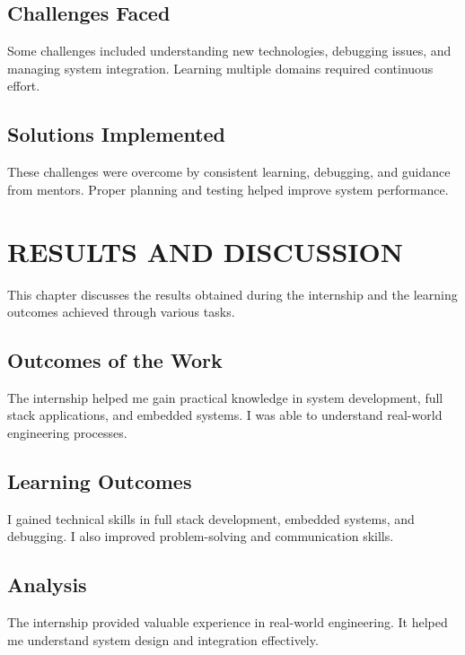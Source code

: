 \documentclass[12pt,a4paper]{report}
\begin{document}
\section{Challenges Faced}

Some challenges included understanding new technologies, debugging issues, and managing system integration. Learning multiple domains required continuous effort.


\section{Solutions Implemented}

These challenges were overcome by consistent learning, debugging, and guidance from mentors. Proper planning and testing helped improve system performance.


\chapter{RESULTS AND DISCUSSION}


This chapter discusses the results obtained during the internship and the learning outcomes achieved through various tasks.




\section{Outcomes of the Work}

The internship helped me gain practical knowledge in system development, full stack applications, and embedded systems. I was able to understand real-world engineering processes.


\section{Learning Outcomes}

I gained technical skills in full stack development, embedded systems, and debugging. I also improved problem-solving and communication skills.


\section{Analysis}

The internship provided valuable experience in real-world engineering. It helped me understand system design and integration effectively.
\end{document}
